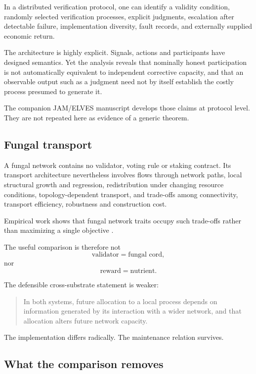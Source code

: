 In a distributed verification protocol, one can identify a validity condition, randomly selected verification processes, explicit judgments, escalation after detectable failure, implementation diversity, fault records, and externally supplied economic return.

The architecture is highly explicit. Signals, actions and participants have designed semantics. Yet the analysis reveals that nominally honest participation is not automatically equivalent to independent corrective capacity, and that an observable output such as a judgment need not by itself establish the costly process presumed to generate it.

The companion JAM/ELVES manuscript develops those claims at protocol level. They are not repeated here as evidence of a generic theorem.

\subsection{Fungal transport}

A fungal network contains no validator, voting rule or staking contract. Its transport architecture nevertheless involves flows through network paths, local structural growth and regression, redistribution under changing resource conditions, topology-dependent transport, and trade-offs among connectivity, transport efficiency, robustness and construction cost.

Empirical work shows that fungal network traits occupy such trade-offs rather than maximizing a single objective \citep{aguilar2022}.

The useful comparison is therefore not
\[
\text{validator}=\text{fungal cord},
\]
nor
\[
\text{reward}=\text{nutrient}.
\]

The defensible cross-substrate statement is weaker:

\begin{quote}
In both systems, future allocation to a local process depends on information generated by its interaction with a wider network, and that allocation alters future network capacity.
\end{quote}

The implementation differs radically. The maintenance relation survives.

\subsection{What the comparison removes}

